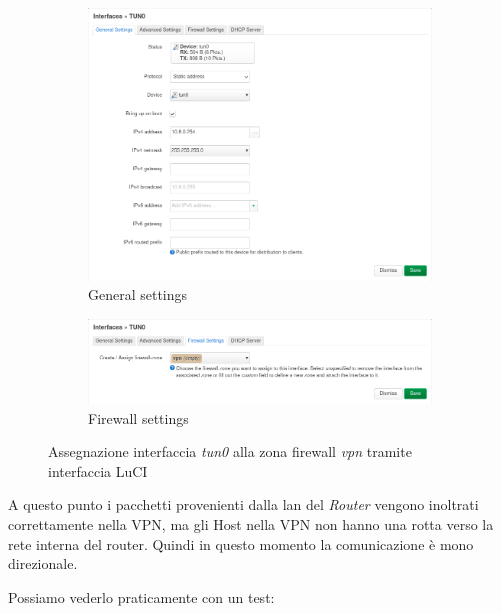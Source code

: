 \begin{figure}[H]
    \centering
    \begin{subfigure}{1\linewidth}
        \centering
        \includegraphics[width=1\linewidth]{immagini/LuCI_int_tun0_1}
        \caption{General settings}
        \label{fig:luci-firewall-interfaces}
    \end{subfigure}
    \medskip
    \begin{subfigure}{1\linewidth}
        \centering
        \includegraphics[width=1\linewidth]{immagini/LuCI_int_tun0_2}
        \caption{Firewall settings}
        \label{fig:luci-firewall-interfaces1}
    \end{subfigure}
    \caption{Assegnazione interfaccia \textit{tun0} alla zona firewall \textit{vpn} tramite interfaccia LuCI}
\end{figure}

A questo punto i pacchetti provenienti dalla lan del \textit{Router} vengono inoltrati correttamente nella VPN, ma gli Host nella VPN non hanno una rotta verso la rete interna del router. Quindi in questo momento la comunicazione è mono direzionale.

Possiamo vederlo praticamente con un test:


